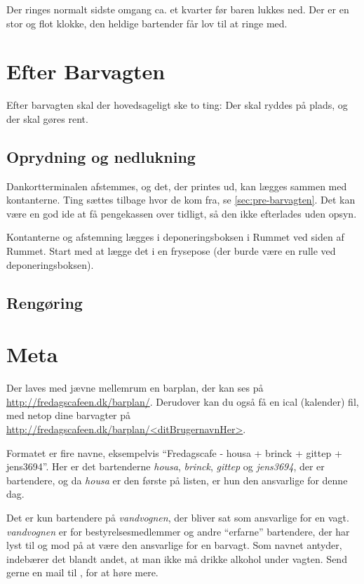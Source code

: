 Der ringes normalt sidste omgang ca. et kvarter før baren lukkes
ned. Der er en stor og flot klokke, den heldige bartender får lov til
at ringe med.

\section{Efter Barvagten}
\label{sec:post-barvagten}

Efter barvagten skal der hovedsageligt ske to ting: Der skal ryddes på
plads, og der skal gøres rent.

\subsection{Oprydning og nedlukning}
\label{sec:post:oprydning}

Dankortterminalen afstemmes, og det, der printes ud, kan lægges sammen
med kontanterne. Ting sættes tilbage hvor de kom fra, se
\autoref{sec:pre-barvagten}. Det kan være en god ide at få pengekassen
over tidligt, så den ikke efterlades uden opsyn.

Kontanterne og afstemning lægges i deponeringsboksen i Rummet ved
siden af Rummet. Start med at lægge det i en frysepose (der burde være
en rulle ved deponeringsboksen).

\subsection{Rengøring}
\label{sec:post:rengoring}


\section{Meta}
\label{sec:meta}

Der laves med jævne mellemrum en barplan, der kan ses på
\url{http://fredagscafeen.dk/barplan/}. Derudover kan du også få en
ical (kalender) fil, med netop dine barvagter på
\url{http://fredagscafeen.dk/barplan/<ditBrugernavnHer>}.

Formatet er fire navne, eksempelvis ``Fredagscafe - housa + brinck +
gittep + jens3694''. Her er det bartenderne \emph{housa},
\emph{brinck}, \emph{gittep} og \emph{jens3694}, der er bartendere, og
da \emph{housa} er den første på listen, er hun den ansvarlige for
denne dag.

Det er kun bartendere på \emph{vandvognen}, der bliver sat som
ansvarlige for en vagt. \emph{vandvognen} er for bestyrelsesmedlemmer
og andre ``erfarne'' bartendere, der har lyst til og mod på at være
den ansvarlige for en barvagt. Som navnet antyder, indebærer det
blandt andet, at man ikke må drikke alkohol under vagten. Send gerne
en mail til , for at høre mere.

